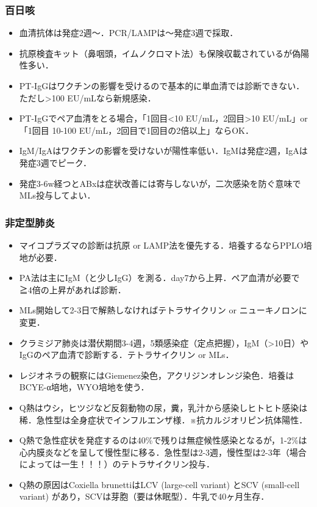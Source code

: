 \subsubsection{百日咳}

\begin{itemize}
\item 血清抗体は発症2週〜．PCR/LAMPは〜発症3週で採取．
\item 抗原検査キット（鼻咽頭，イムノクロマト法）も保険収載されているが偽陽性多い．
\item PT-IgGはワクチンの影響を受けるので基本的に単血清では診断できない．ただし>100 EU/mLなら新規感染．
\item PT-IgGでペア血清をとる場合，「1回目<10 EU/mL，2回目>10 EU/mL」or「1回目 10-100 EU/mL，2回目で1回目の2倍以上」ならOK．
\item IgM/IgAはワクチンの影響を受けないが陽性率低い．IgMは発症2週，IgAは発症3週でピーク．
\item 発症3-6w経つとABxは症状改善には寄与しないが，二次感染を防ぐ意味でMLs投与してよい．
\end{itemize}


\subsubsection{非定型肺炎}

\begin{itemize}
\item マイコプラズマの診断は抗原 or LAMP法を優先する．培養するならPPLO培地が必要．
\item PA法は主にIgM（と少しIgG）を測る．day7から上昇．ペア血清が必要で≧4倍の上昇があれば診断．
\item MLs開始して2-3日で解熱しなければテトラサイクリン or ニューキノロンに変更．
\item クラミジア肺炎は潜伏期間3-4週，5類感染症（定点把握），IgM（>10日）やIgGのペア血清で診断する．テトラサイクリン or MLs．
\item レジオネラの観察にはGiemenez染色，アクリジンオレンジ染色．培養はBCYE-α培地，WYO培地を使う．
\item Q熱はウシ，ヒツジなど反芻動物の尿，糞，乳汁から感染しヒトヒト感染は稀．急性型は全身症状でインフルエンザ様．※抗カルジオリピン抗体陽性．
\item Q熱で急性症状を発症するのは40\%で残りは無症候性感染となるが，1-2\%は心内膜炎などを呈して慢性型に移る．急性型は2-3週，慢性型は2-3年（場合によっては一生！！！）のテトラサイクリン投与．
\item Q熱の原因はCoxiella brunettiはLCV (large-cell variant) とSCV (small-cell variant) があり，SCVは芽胞（要は休眠型）．牛乳で40ヶ月生存．
\end{itemize}


